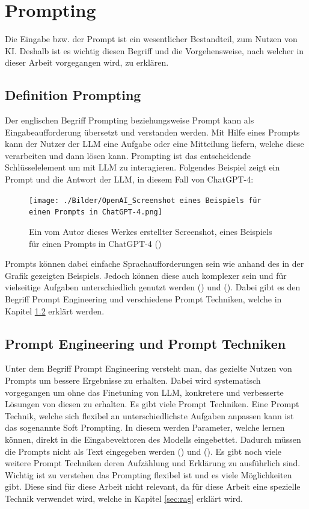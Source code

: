 \documentclass[12pt,toc=bib,toc=listof]{scrreprt}
\begin{document}
\section{Prompting} %
\label{sec:prompting}
Die Eingabe bzw. der Prompt ist ein wesentlicher Bestandteil, zum Nutzen von KI. Deshalb ist es wichtig diesen Begriff und die Vorgehensweise, nach welcher in dieser Arbeit vorgegangen wird, zu erklären.

\subsection{Definition Prompting} %
\label{sec:definitionPrompting}
Der englischen Begriff Prompting beziehungsweise Prompt kann als Eingabeaufforderung übersetzt und verstanden werden. Mit Hilfe eines Prompts kann der Nutzer der LLM eine Aufgabe oder eine Mitteilung liefern, welche diese verarbeiten und dann lösen kann. Prompting ist das entscheidende Schlüsselelement um mit LLM zu interagieren. Folgendes Beispiel zeigt ein Prompt und die Antwort der LLM, in diesem Fall von ChatGPT-4:

\begin{figure} [H]
    \centering
    \texttt{[image: ./Bilder/OpenAI\_Screenshot eines Beispiels für einen Prompts in ChatGPT-4.png]}
    \caption{Ein vom Autor dieses Werkes erstellter Screenshot, eines Beispiels für einen Prompts in ChatGPT-4 (\cite{OpenAI2025})}
    \label{fig:enter-label}
\end{figure}

\noindent Prompts können dabei einfache Sprachaufforderungen sein wie anhand des in der Grafik gezeigten Beispiels. Jedoch können diese auch komplexer sein und für vielseitige Aufgaben unterschiedlich genutzt werden (\cite{Gu2023}) und (\cite{Liu2023}). Dabei gibt es den Begriff Prompt Engineering und verschiedene Prompt Techniken, welche in Kapitel \ref{sec:promptEngineeringUndPromptTechniken} erklärt werden.

\subsection{Prompt Engineering und Prompt Techniken} %
\label{sec:promptEngineeringUndPromptTechniken}
Unter dem Begriff Prompt Engineering versteht man, das gezielte Nutzen von Prompts um bessere Ergebnisse zu erhalten. Dabei wird systematisch vorgegangen um ohne das Finetuning von LLM, konkretere und verbesserte Lösungen von diesen zu erhalten. Es gibt viele Prompt Techniken. Eine Prompt Technik, welche sich flexibel an unterschiedlichste Aufgaben anpassen kann ist das sogenannte Soft Prompting. In diesem werden Parameter, welche lernen können, direkt in die Eingabevektoren des Modells eingebettet. Dadurch müssen die Prompts nicht als Text eingegeben werden (\cite{Gu2023}) und (\cite{Liu2023}). Es gibt noch viele weitere Prompt Techniken deren Aufzählung und Erklärung zu ausführlich sind. Wichtig ist zu verstehen das Prompting flexibel ist und es viele Möglichkeiten gibt. Diese sind für diese Arbeit nicht relevant, da für diese Arbeit eine spezielle Technik verwendet wird, welche in Kapitel \ref{sec:rag} erklärt wird.
\end{document}
